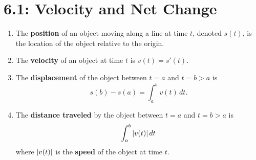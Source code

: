 \documentclass[../mathNotesPreamble]{subfiles}
\begin{document}
\section{6.1: Velocity and Net Change}

  \begin{defn*}
    \begin{enumerate}
      \item 
        The \textbf{position} of an object moving along a line at time $t$, denoted $s(t)$, is the location of the object relative to the origin.
      \item 
        The \textbf{velocity} of an object at time $t$ is $v(t)=s'(t)$.
      \item 
        The \textbf{displacement} of the object between $t=a$ and $t=b>a$ is
          \[s(b)-s(a)=\int_a^b v(t)\,dt.\]
      \item 
        The \textbf{distance traveled} by the object between $t=a$ and $t=b>a$ is
          \[\int_a^b{\left\vert v(t)\right\vert}\,dt\]
        where ${\left\vert v(t)\right\vert}$ is the \textbf{speed} of the object at time $t$.
    \end{enumerate}
  \end{defn*}
\end{document}
